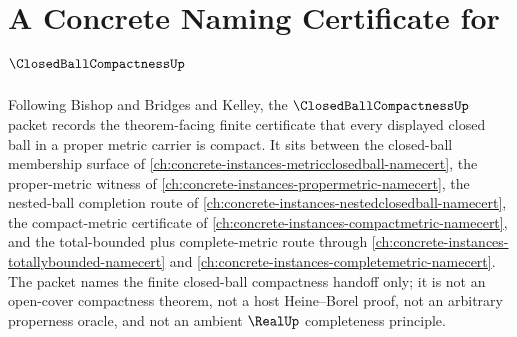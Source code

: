 \chapter{A Concrete Naming Certificate for $\ClosedBallCompactnessUp$}
\label{ch:concrete-instances-closed-ball-compactness-namecert}

Following Bishop and Bridges and Kelley, the $\ClosedBallCompactnessUp$ packet records the theorem-facing finite certificate that every displayed closed ball in a proper metric carrier is compact. It sits between the closed-ball membership surface of \autoref{ch:concrete-instances-metricclosedball-namecert}, the proper-metric witness of \autoref{ch:concrete-instances-propermetric-namecert}, the nested-ball completion route of \autoref{ch:concrete-instances-nestedclosedball-namecert}, the compact-metric certificate of \autoref{ch:concrete-instances-compactmetric-namecert}, and the total-bounded plus complete-metric route through \autoref{ch:concrete-instances-totallybounded-namecert} and \autoref{ch:concrete-instances-completemetric-namecert}. The packet names the finite closed-ball compactness handoff only; it is not an open-cover compactness theorem, not a host Heine--Borel proof, not an arbitrary properness oracle, and not an ambient $\RealUp$ completeness principle.

